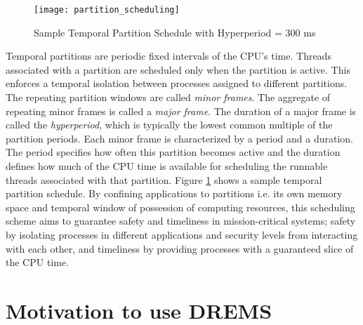 \begin{figure}[ht]
	\centering
	\texttt{[image: partition\_scheduling]}
	\caption{Sample Temporal Partition Schedule with Hyperperiod = 300 ms}
	\label{fig:partition_scheduling}
\end{figure}


Temporal partitions are periodic fixed intervals of the CPU's time. Threads associated with a partition are scheduled only when the partition is active. This enforces a temporal isolation between processes assigned to different partitions. The repeating partition windows are called \emph{minor frames}. The aggregate of repeating minor frames is called a \emph{major frame}. The duration of a major frame is called the \emph{hyperperiod}, which is typically the lowest common multiple of the partition periods. Each minor frame is characterized by a period and a duration. The period specifies how often this partition becomes active and the duration defines how much of the CPU time is available for scheduling the runnable threads associated with that partition. Figure \ref{fig:partition_scheduling} shows a sample temporal partition schedule. By confining applications to partitions i.e. its own memory space and temporal window of possession of computing resources, this scheduling scheme aims to guarantee safety and timeliness in mission-critical systems; safety by isolating processes in different applications and security levels from interacting with each other, and timeliness by providing processes with a guaranteed slice of the CPU time. 
 


\section{Motivation to use DREMS}


